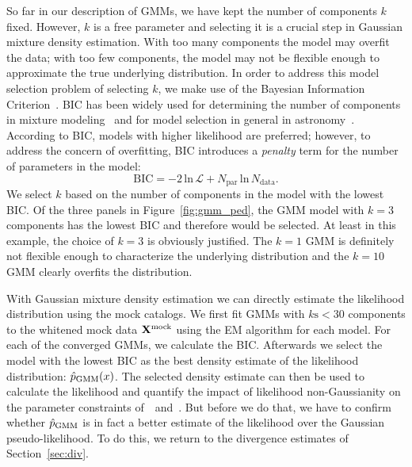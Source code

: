 \documentclass[12pt, letterpaper, preprint]{aastex}
\newcommand{\beq}{\begin{equation}}
\newcommand{\eeq}{\end{equation}}
\newcommand{\Xmock}{{\bf X}^\mathrm{mock}}
\newcommand{\Beut}{\citetalias{beutler2017}}
\newcommand{\Sinh}{\citetalias{sinha2017a}}
\begin{document}
So far in our description of GMMs, we have kept
the number of components $k$ fixed. However, $k$ is a free 
parameter and selecting it is a crucial step in Gaussian mixture
density estimation. With too many components the model may overfit 
the data; with too few components, 
the model may not be flexible enough to approximate the true 
underlying distribution. In order to address this model selection problem
of selecting $k$, we make use of the Bayesian Information 
Criterion~\citep[BIC;][]{schwarz1978}. BIC has been widely used for 
determining the number of components in mixture 
modeling~\citep[\emph{e.g.}][]{leroux1992,roeder1997,fraley1998,steele2010performance}
and for model selection in general in 
astronomy~\citep[\emph{e.g.}][]{liddle2007,broderick2011,wilkinson2015,vakili2016}.
According to BIC, models with higher likelihood are preferred; however, 
to address the concern of overfitting, BIC introduces a \emph{penalty} term 
for the number of parameters in the model: 
\beq \label{eq:bic}
\mathrm{BIC} = -2\,\mathrm{ln}\,\mathcal{L} + N_\mathrm{par}\,\mathrm{ln}\,N_\mathrm{data}.
\eeq
We select $k$ based on the number of components in the model with the 
lowest BIC. Of the three panels in Figure~\ref{fig:gmm_ped}, the GMM 
model with $k=3$ components has the lowest BIC and therefore would be 
selected. At least in this example, the choice of $k=3$ is 
obviously justified. The $k = 1$ GMM is definitely not flexible enough 
to characterize the underlying distribution and the $k=10$ GMM clearly
overfits the distribution. 

With Gaussian mixture density estimation we can directly estimate 
the likelihood distribution using the mock catalogs. We first fit 
GMMs with $k\mathrm{s} < 30$ components to the whitened 
mock data $\Xmock$ using the EM algorithm for each model. For each of the 
converged GMMs, we calculate the BIC. Afterwards we select 
the model with the lowest BIC as the best density estimate of the likelihood 
distribution: $\hat{p}_\mathrm{\tiny GMM}(x)$. The selected density estimate can 
then be used to calculate the
likelihood and quantify the impact of likelihood non-Gaussianity on the 
parameter constraints of~\Beut~and~\Sinh. But before we do that, we have to 
confirm whether $\hat{p}_\mathrm{\tiny GMM}$ is in fact a better estimate 
of the likelihood over the Gaussian pseudo-likelihood. To do this, we return 
to the divergence estimates of Section~\ref{sec:div}. 
\end{document}
